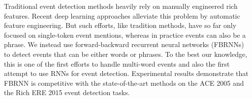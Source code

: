 Traditional event detection methods heavily rely on manually engineered rich features. Recent deep learning approaches alleviate this problem by automatic feature engineering. But such efforts, like tradition methods, have so far only focused on single-token event mentions, whereas in practice events can also be a phrase. We instead use forward-backward recurrent neural networks (FBRNNs) to detect events that can be either words or phrases. To the best our knowledge, this is one of the first efforts to handle multi-word events and also the first attempt to use RNNs for event detection. Experimental results demonstrate that FBRNN is competitive with the state-of-the-art methods on the ACE 2005 and the Rich ERE 2015 event detection tasks.
